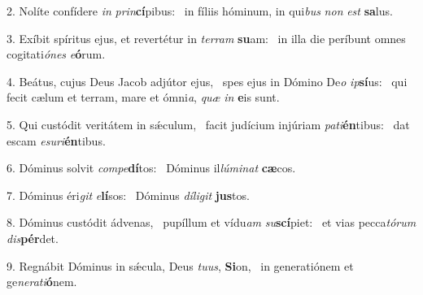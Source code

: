 2. Nolíte confídere \textit{in} \textit{prin}\textbf{cí}pibus: \ast\  in fíliis hóminum, in qui\textit{bus} \textit{non} \textit{est} \textbf{sa}lus.\

3. Exíbit spíritus ejus, et revertétur in \textit{ter}\textit{ram} \textbf{su}am: \ast\  in illa die períbunt omnes cogitati\textit{ó}\textit{nes} \textit{e}\textbf{ó}rum.\

4. Beátus, cujus Deus Jacob adjútor ejus, \dag\  spes ejus in Dómino De\textit{o} \textit{ip}\textbf{sí}us: \ast\  qui fecit cælum et terram, mare et ómni\textit{a}, \textit{quæ} \textit{in} \textbf{e}is sunt.\

5. Qui custódit veritátem in sǽculum, \dag\  facit judícium injúriam \textit{pa}\textit{ti}\textbf{én}tibus: \ast\  dat escam \textit{e}\textit{su}\textit{ri}\textbf{én}tibus.\

6. Dóminus solvit \textit{com}\textit{pe}\textbf{dí}tos: \ast\  Dóminus il\textit{lú}\textit{mi}\textit{nat} \textbf{cæ}cos.\

7. Dóminus éri\textit{git} \textit{e}\textbf{lí}sos: \ast\  Dóminus \textit{dí}\textit{li}\textit{git} \textbf{jus}tos.\

8. Dóminus custódit ádvenas, \dag\  pupíllum et vídu\textit{am} \textit{su}\textbf{scí}piet: \ast\  et vias pecca\textit{tó}\textit{rum} \textit{dis}\textbf{pér}det.\

9. Regnábit Dóminus in sǽcula, Deus \textit{tu}\textit{us}, \textbf{Si}on, \ast\  in generatiónem et ge\textit{ne}\textit{ra}\textit{ti}\textbf{ó}nem.\

